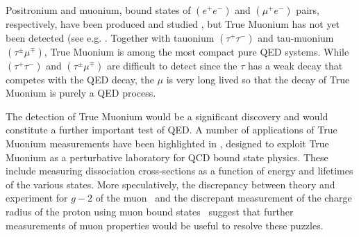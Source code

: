 Positronium and muonium, bound states of $(e^+ e^-)$ and $(\mu^+ e^-)$ pairs, respectively, have been
produced and studied \cite{Deutsch:1951zza,Friedman:1957mz,Hughes:1960zz}, but True Muonium has not yet been 
detected (see e.g. \cite{Holvik:1986ty,ArteagaRomero:2000yh,Brodsky:2009gx,Bilenky:1969zd,Hughes:1971,Malenfant:1987tm,Karshenboim:1998we,Owen:1972,Jentschura:1997ma,Jentschura:1997tv,Karshenboim:1998am}. 
Together with tauonium $(\tau^+ \tau^-)$ and tau-muonium $(\tau^{\pm} \mu^{\mp})$, True Muonium is among the most
compact pure QED systems. While $(\tau^+ \tau^-)$ and $(\tau^{\pm} \mu^{\mp})$ are difficult to detect since the $\tau$ has a
weak decay that competes with the QED decay, the $\mu$ is very long lived so that the decay of True
Muonium is purely a QED process. 

The detection of True Muonium would be a significant discovery and would constitute a further important test of QED.   
A number of applications of True Muonium measurements have been highlighted in 
\cite{Brodsky:2009gx}, designed to exploit True Muonium as a perturbative laboratory 
for QCD bound state physics. 
These include measuring dissociation cross-sections as a function of energy and lifetimes of the various states. 
More speculatively, the discrepancy between theory and experiment for $g-2$ of the muon~\cite{Bennett:2006fi} and the discrepant measurement of
the charge radius of the proton using muon bound states~\cite{Pohl:2010zza} suggest that further measurements of 
muon properties would be useful to resolve these puzzles. 

 
